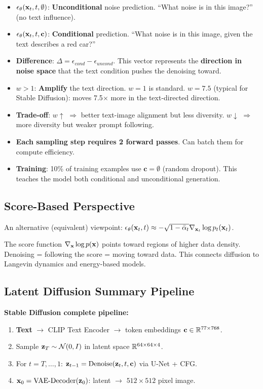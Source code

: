 \begin{keybox}
\begin{itemize}
\item $\epsilon_\theta(\mathbf{x}_t, t, \emptyset)$: \textbf{Unconditional} noise prediction. ``What noise is in this image?'' (no text influence).
\item $\epsilon_\theta(\mathbf{x}_t, t, \mathbf{c})$: \textbf{Conditional} prediction. ``What noise is in this image, given the text describes a red car?''
\item \textbf{Difference}: $\Delta = \epsilon_{cond} - \epsilon_{uncond}$. This vector represents the \textbf{direction in noise space} that the text condition pushes the denoising toward.
\item $w > 1$: \textbf{Amplify} the text direction. $w = 1$ is standard. $w = 7.5$ (typical for Stable Diffusion): moves 7.5$\times$ more in the text-directed direction.
\item \textbf{Trade-off}: $w \uparrow$ $\Rightarrow$ better text-image alignment but less diversity. $w \downarrow$ $\Rightarrow$ more diversity but weaker prompt following.
\item \textbf{Each sampling step requires 2 forward passes}. Can batch them for compute efficiency.
\item \textbf{Training}: 10\% of training examples use $\mathbf{c} = \emptyset$ (random dropout). This teaches the model both conditional and unconditional generation.
\end{itemize}
\end{keybox}

\subsection{Score-Based Perspective}
An alternative (equivalent) viewpoint: $\epsilon_\theta(\mathbf{x}_t, t) \approx -\sqrt{1-\bar\alpha_t}\nabla_{\mathbf{x}_t}\log p_t(\mathbf{x}_t)$.

The score function $\nabla_{\mathbf{x}} \log p(\mathbf{x})$ points toward regions of higher data density. Denoising = following the score = moving toward data. This connects diffusion to Langevin dynamics and energy-based models.

\subsection{Latent Diffusion Summary Pipeline}
\textbf{Stable Diffusion complete pipeline:}
\begin{enumerate}
\item \textbf{Text} $\to$ CLIP Text Encoder $\to$ token embeddings $\mathbf{c} \in \mathbb{R}^{77 \times 768}$.
\item Sample $\mathbf{z}_T \sim \mathcal{N}(0,I)$ in latent space $\mathbb{R}^{64 \times 64 \times 4}$.
\item For $t = T, \ldots, 1$: $\mathbf{z}_{t-1} = \text{Denoise}(\mathbf{z}_t, t, \mathbf{c})$ via U-Net + CFG.
\item $\mathbf{x}_0 = \text{VAE-Decoder}(\mathbf{z}_0)$: latent $\to$ $512 \times 512$ pixel image.
\end{enumerate}

